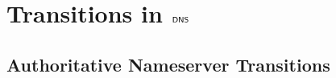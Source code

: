\documentclass[english,acmsmall, screen, nonacm]{acmart}
\theoremstyle{plain}
\theoremstyle{definition}
\theoremstyle{remark}
\begin{document}
	
	
	
	
	
	
	
	
	
	
	\clearpage
	
	




\clearpage
\appendix



\section{Transitions in $\scrsf{dns}$}\label{appx:transitions}

\subsection{Authoritative Nameserver Transitions\label{appx:ns-full-trans}}
\end{document}
